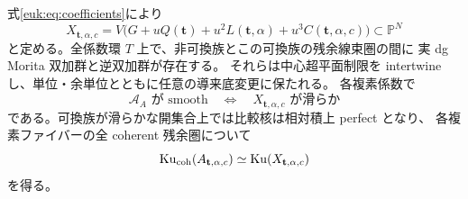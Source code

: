 \begin{theorem}[任意の固定楕円因子の全係数比較]
\label{euk:thm:universal-kernel}
式\eqref{euk:eq:coefficients}により
\[
 X_{\mathbf t,\alpha,c}
  =V\bigl(G+uQ(\mathbf t)+u^2L(\mathbf t,\alpha)
                    +u^3C(\mathbf t,\alpha,c)\bigr)\subset\mathbb P^N
\]
と定める。全係数環 $T$ 上で、非可換族とこの可換族の残余線束圏の間に
実 dg Morita 双加群と逆双加群が存在する。
それらは中心超平面制限を intertwine し、単位・余単位とともに任意の導来底変更に保たれる。
各複素係数で
\[
 \mathcal A_A\text{ が smooth}
       \quad\Longleftrightarrow\quad
 X_{\mathbf t,\alpha,c}\text{ が滑らか}
\]
である。可換族が滑らかな開集合上では比較核は相対積上 perfect となり、
各複素ファイバーの全 coherent 残余圏について
\[
          \operatorname{Ku}_{\mathrm{coh}}(A_{\mathbf t,\alpha,c})
             \simeq\operatorname{Ku}(X_{\mathbf t,\alpha,c})
\]
を得る。
\end{theorem}

